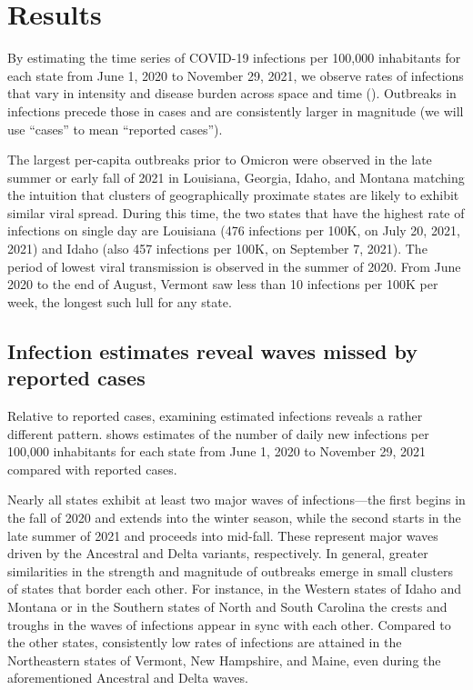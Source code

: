 \section{Results}
\label{sec:results}

By estimating the time series of COVID-19 infections per 100,000 inhabitants
for each \US state from June 1, 2020 to November 29, 2021, we observe rates of
infections that vary in intensity and disease burden across space and time
(). Outbreaks in
infections precede those in cases and are consistently larger in magnitude
(we will use ``cases'' to mean ``reported cases'').

The largest per-capita outbreaks prior to Omicron were observed in the late
summer or early fall of 2021 in Louisiana, Georgia, Idaho, and Montana matching
the intuition that clusters of geographically proximate states are likely to
exhibit similar viral spread. During this time, the two states that have the
highest rate of infections on single day are Louisiana (476 infections per 100K,
on July 20, 2021, 2021) and Idaho (also 457 infections per 100K, on September 7,
2021). The period of lowest viral transmission is observed in the summer of
2020. From June 2020 to the end of August, Vermont saw less than 10 infections
per 100K per week, the longest such lull for any state.



\subsection{Infection estimates reveal waves missed by reported cases}
\label{sec:omitted-waves}

Relative to reported cases, examining estimated infections reveals a rather
different pattern.  shows estimates of the number of
daily new infections per 100,000 inhabitants for each \US state from June 1,
2020 to November 29, 2021 compared with reported cases. 

Nearly all states exhibit at least two major waves of infections---the first
begins in the fall of 2020 and extends into the winter season, while the second
starts in the late summer of 2021 and proceeds into mid-fall. These
represent major waves driven by the Ancestral and Delta variants, respectively.
In general, greater similarities in the strength and magnitude of outbreaks
emerge in small clusters of states that border each other. For instance, in the
Western states of Idaho and Montana or in the Southern states of North and South
Carolina the crests and troughs in the waves of infections appear in sync with each
other. Compared to the other states, consistently low rates of infections are
attained in the Northeastern states of Vermont, New Hampshire, and Maine, even
during the aforementioned Ancestral and Delta waves.

